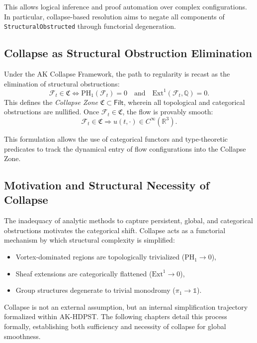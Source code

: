 \documentclass[11pt]{article}
\begin{document}
This allows logical inference and proof automation over complex configurations. In particular, collapse-based resolution aims to negate all components of \texttt{StructuralObstructed} through functorial degeneration.

\subsection{Collapse as Structural Obstruction Elimination}

Under the AK Collapse Framework, the path to regularity is recast as the elimination of structural obstructions:
\[
\mathcal{F}_t \in \mathfrak{C} \iff
\mathrm{PH}_1(\mathcal{F}_t) = 0 \quad \text{and} \quad \mathrm{Ext}^1(\mathcal{F}_t, \mathbb{Q}) = 0.
\]
This defines the \emph{Collapse Zone} \( \mathfrak{C} \subset \mathsf{Filt} \), wherein all topological and categorical obstructions are nullified. Once \( \mathcal{F}_t \in \mathfrak{C} \), the flow is provably smooth:
\[
\mathcal{F}_t \in \mathfrak{C} \Rightarrow u(t, \cdot) \in C^\infty(\mathbb{R}^3).
\]

This formulation allows the use of categorical functors and type-theoretic predicates to track the dynamical entry of flow configurations into the Collapse Zone.

\subsection{Motivation and Structural Necessity of Collapse}

The inadequacy of analytic methods to capture persistent, global, and categorical obstructions motivates the categorical shift. Collapse acts as a functorial mechanism by which structural complexity is simplified:
\begin{itemize}
  \item Vortex-dominated regions are topologically trivialized (\( \mathrm{PH}_1 \to 0 \)),
  \item Sheaf extensions are categorically flattened (\( \mathrm{Ext}^1 \to 0 \)),
  \item Group structures degenerate to trivial monodromy (\( \pi_1 \to \mathbb{1} \)).
\end{itemize}

Collapse is not an external assumption, but an internal simplification trajectory formalized within AK-HDPST. The following chapters detail this process formally, establishing both sufficiency and necessity of collapse for global smoothness.
\end{document}
